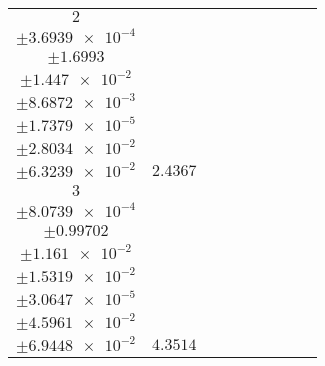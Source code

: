 \documentclass[8pt]{article}
\begin{document}
\begin{longtable}[l]{c c c c c c c c c}
$\num{2}$ & \begin{tabular}[c]{@{}c@{}}$\num{3.3707e-2}$ \\ $\pm\num{3.6939e-4}$\end{tabular} & \begin{tabular}[c]{@{}c@{}}$\num{-3.7449}$ \\ $\pm\num{1.6993}$\end{tabular} & \begin{tabular}[c]{@{}c@{}}$\num{-5.6364}$ \\ $\pm\num{1.447e-2}$\end{tabular} & \begin{tabular}[c]{@{}c@{}}$\num{2.9513e+3}$ \\ $\pm\num{8.6872e-3}$\end{tabular} & \begin{tabular}[c]{@{}c@{}}$\num{5.9042}$ \\ $\pm\num{1.7379e-5}$\end{tabular} & \begin{tabular}[c]{@{}c@{}}$\num{2.639}$ \\ $\pm\num{2.8034e-2}$\end{tabular} & \begin{tabular}[c]{@{}c@{}}$\num{4.8389}$ \\ $\pm\num{6.3239e-2}$\end{tabular} & $\num{2.4367}$\\
$\num{3}$ & \begin{tabular}[c]{@{}c@{}}$\num{6.8426e-2}$ \\ $\pm\num{8.0739e-4}$\end{tabular} & \begin{tabular}[c]{@{}c@{}}$\num{7.8196}$ \\ $\pm\num{0.99702}$\end{tabular} & \begin{tabular}[c]{@{}c@{}}$\num{-0.99932}$ \\ $\pm\num{1.161e-2}$\end{tabular} & \begin{tabular}[c]{@{}c@{}}$\num{2.9559e+3}$ \\ $\pm\num{1.5319e-2}$\end{tabular} & \begin{tabular}[c]{@{}c@{}}$\num{5.9135}$ \\ $\pm\num{3.0647e-5}$\end{tabular} & \begin{tabular}[c]{@{}c@{}}$\num{4.3272}$ \\ $\pm\num{4.5961e-2}$\end{tabular} & \begin{tabular}[c]{@{}c@{}}$\num{6.861}$ \\ $\pm\num{6.9448e-2}$\end{tabular} & $\num{4.3514}$\\

\end{longtable}
\end{document}
